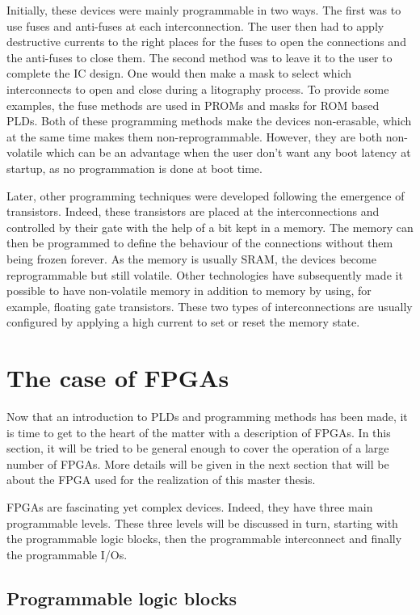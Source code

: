 Initially, these devices were mainly programmable in two ways. The first was to use fuses and 
anti-fuses at each interconnection. The user then had to apply destructive currents to the right 
places for the fuses to open the connections and the anti-fuses to close them. The second method was 
to leave it to the user to complete the IC design. One would then make a mask to select which 
interconnects to open and close during a litography process. To provide some examples, the fuse 
methods are used in PROMs and 
masks for ROM based PLDs. Both of these programming methods make the devices non-erasable, which at 
the same time makes them non-reprogrammable. However, they are both non-volatile which can be an 
advantage when the user don't want any boot latency at startup, as no programmation is done at boot
time.

Later, other programming techniques were developed following the emergence of transistors. Indeed, 
these transistors are placed at the interconnections and controlled by their gate with the help of 
a bit kept in a memory. The memory can then be programmed to define the behaviour of the connections 
without them being frozen forever. As the memory is usually SRAM, the devices become reprogrammable
but still volatile. Other technologies have subsequently made it possible to have non-volatile 
memory in addition to memory by using, for example, floating gate transistors. These two types of 
interconnections are usually configured by applying a high current to set or reset the memory state. 

\section{The case of FPGAs}

Now that an introduction to PLDs and programming methods has been made, it is time to get to the 
heart of the matter with a description of FPGAs. In this section, it will be tried to be general 
enough to cover the operation of a large number of FPGAs. More details will be given in the next 
section that will be about the FPGA used for the realization of this master thesis.

FPGAs are fascinating yet complex devices. Indeed, they have three main programmable levels. These 
three levels will be discussed in turn, starting with the programmable logic blocks, then the 
programmable interconnect and finally the programmable I/Os. 

\subsection{Programmable logic blocks}


